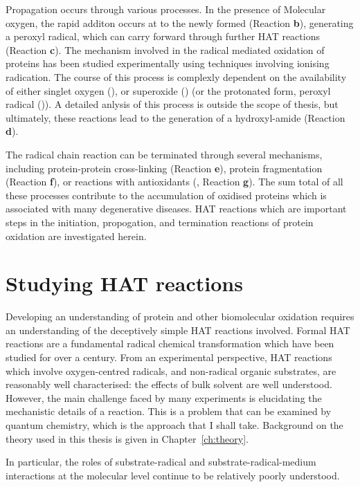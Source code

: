 Propagation occurs through various processes. In the presence of Molecular oxygen, the rapid additon occurs at to the newly formed  (Reaction \textbf{b}), generating a peroxyl radical, which can carry forward through further HAT reactions (Reaction \textbf{c}).\cite{Stadtman2003} The mechanism involved in the radical mediated oxidation of proteins has been studied experimentally using techniques involving ionising radication.\cite{Garrsion1962,Garrison1987} The course of this process is complexly dependent on the availability of either singlet oxygen (), or superoxide () (or the protonated form, peroxyl radical ()). A detailed anlysis of this process is outside the scope of thesis, but ultimately, these reactions lead to the generation of a hydroxyl-amide (Reaction \textbf{d}).

The radical chain reaction can be terminated through several mechanisms, including protein-protein cross-linking (Reaction \textbf{e}), protein fragmentation (Reaction \textbf{f}), or reactions with antioxidants (, Reaction \textbf{g}). The sum total of all these processes contribute to the accumulation of oxidised proteins which is associated with many degenerative diseases.\cite{Halliwell2006} HAT reactions which are important steps in the initiation, propogation, and termination reactions of protein oxidation are investigated herein.

\section{Studying HAT reactions}

Developing an understanding of protein and other biomolecular oxidation requires an understanding of the deceptively simple HAT reactions involved. Formal HAT reactions are a fundamental radical chemical transformation which have been studied for over a century.\cite{Kochi1973, Parsons2000} From an experimental perspective, HAT reactions which involve oxygen-centred radicals, and non-radical organic substrates, are reasonably well characterised: the effects of bulk solvent are well understood.\cite{Litwinienko2007} However, the main challenge faced by many experiments is elucidating the mechanistic details of a reaction. This is a problem that can be examined by quantum chemistry, which is the approach that I shall take. Background on the theory used in this thesis is given in Chapter~\ref{ch:theory}.

In particular, the roles of substrate-radical and substrate-radical-medium interactions at the molecular level continue to be relatively poorly understood.



